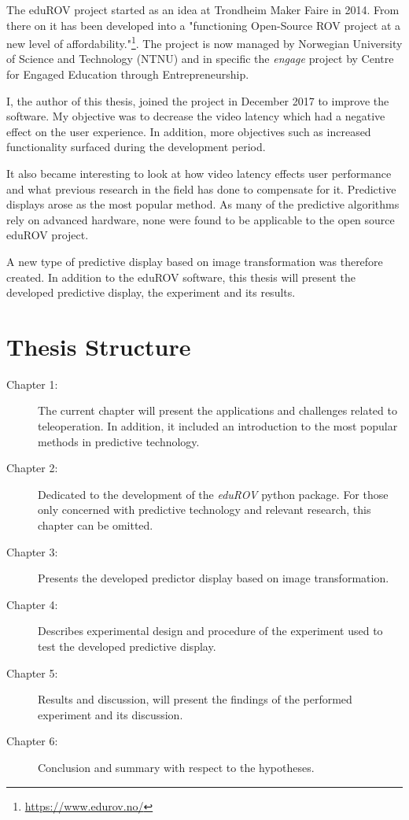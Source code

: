 The eduROV project started as an idea at Trondheim Maker Faire in 2014. From there on it has been developed into a "functioning Open-Source ROV project at a new level of affordability."\footnote{\url{https://www.edurov.no/}}. The project is now managed by Norwegian University of Science and Technology (NTNU) and in specific the \emph{engage} project by Centre for Engaged Education through Entrepreneurship. 

I, the author of this thesis, joined the project in December 2017 to improve the software. My objective was to decrease the video latency which had a negative effect on the user experience. In addition, more objectives such as increased functionality surfaced during the development period.

It also became interesting to look at how video latency effects user performance and what previous research in the field has done to compensate for it. Predictive displays arose as the most popular method. As many of the predictive algorithms rely on advanced hardware, none were found to be applicable to the open source eduROV project.

A new type of predictive display based on image transformation was therefore created. In addition to the eduROV software, this thesis will present the developed predictive display, the experiment and its results.

\section{Thesis Structure}

\begin{description}
\item [Chapter 1:] The current chapter will present the applications and challenges related to teleoperation. In addition, it included an introduction to the most popular methods in predictive technology.

\item [Chapter 2:] Dedicated to the development of the \textit{eduROV} python package. For those only concerned with predictive technology and relevant research, this chapter can be omitted.

\item [Chapter 3:] Presents the developed predictor display based on image transformation.

\item [Chapter 4:] Describes experimental design and procedure of the experiment used to test the developed predictive display.

\item [Chapter 5:] Results and discussion, will present the findings of the performed experiment and its discussion.

\item [Chapter 6:] Conclusion and summary with respect to the hypotheses.
\end{description}

